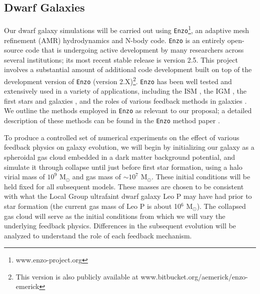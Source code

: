 \documentclass[11pt]{article}
\newcommand{\eg}{e.g.,}
\begin{document}
\subsection{Dwarf Galaxies}
Our dwarf galaxy simulations will be carried out using \texttt{Enzo}\footnote{www.enzo-project.org}, an adaptive mesh refinement (AMR) hydrodynamics and N-body code. \texttt{Enzo} is an entirely open-source code that is undergoing active development by many researchers across several institutions; its most recent stable release is version 2.5. This project involves a substantial amount of additional code development built on top of the development version of \texttt{Enzo} (version 2.X)\footnote{This version is also publicly available at www.bitbucket.org/aemerick/enzo-emerick}. \texttt{Enzo} has been well tested and extensively used in a variety of applications, including the ISM \citep{2005MNRAS.356..737S, 2008ApJ...673..810T}, the IGM \citep{2000ApJ...534...57B, 2001ApJ...561L..31F}, the first stars and galaxies \citep[\eg][]{Wise2012a, WiseAbel2012, Wise2014}, and the roles of various feedback methods in galaxies \citep[\eg][]{Simpson2015, SalemBryan2014, Goldbaum2016, Forbes2016}. We outline the methods employed in \texttt{Enzo} as relevant to our proposal; a detailed description of these methods can be found in the \texttt{Enzo} method paper \citep{Enzo2014}. 

To produce a controlled set of numerical experiments on the effect of various feedback physics on galaxy evolution, we will begin by initializing our galaxy as a spheroidal gas cloud embedded in a dark matter background potential, and simulate it through collapse until just before first star formation, using a halo virial mass of $10^{9}$ M$_{\odot}$ and gas mass of $\sim10^{7}$ M$_{\odot}$. These initial conditions will be held fixed for all subsequent models. These masses are chosen to be consistent with what the Local Group ultrafaint dwarf galaxy Leo P \citep{McQuinn2013, Giovanelli2013, Skillman2013, McQuinn2015} may have had prior to star formation (the current gas mass of Leo P is about 10$^{6}$ M$_{\odot}$). The collapsed gas cloud will serve as the initial conditions from which we will vary the underlying feedback physics. Differences in the subsequent evolution will be analyzed to understand the role of each feedback mechanism. 
\end{document}
